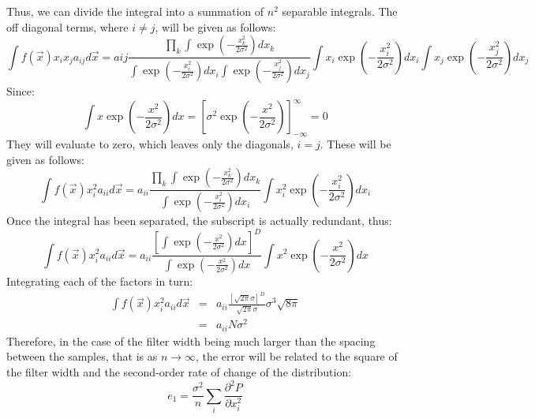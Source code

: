 \documentclass[11pt]{article}
\begin{document}
Thus, we can divide the integral into a summation of $n^2$ separable integrals.
The off diagonal terms, where $i \ne j$, will be given as follows:
\begin{equation}
  \int f(\vec x) x_i x_j a_{ij} d\vec x = 
	a{ij} \frac{\prod_k \int \exp \left (-\frac{x_k^2}{2\sigma^2} \right ) dx_k}
	{\int \exp \left (-\frac{x_i^2}{2\sigma^2} \right ) dx_i
	\int \exp \left (-\frac{x_j^2}{2\sigma^2} \right ) dx_j}
	\int x_i \exp \left (-\frac{x_i^2}{2\sigma^2} \right ) dx_i
	\int x_j \exp \left (-\frac{x_j^2}{2\sigma^2} \right ) dx_j
\end{equation}
Since:
\begin{equation}
  \int x \exp \left (-\frac{x^2}{2\sigma^2} \right ) dx 
	= \left [\sigma^2 \exp \left (-\frac{x^2}{2\sigma^2} \right ) \right ]_{-\infty}^\infty
	= 0
\end{equation}
They will evaluate to zero, which leaves only the diagonals, $i=j$.  
These will be given as follows:
\begin{equation}
  \int f(\vec x) x_i^2 a_{ii} d\vec x =  
	a_{ii} \frac{\prod_k \int \exp \left (-\frac{x_k^2}{2\sigma^2} \right ) dx_k}
        {\int \exp \left (-\frac{x_i^2}{2\sigma^2} \right ) dx_i}
        \int x_i^2 \exp \left (-\frac{x_i^2}{2\sigma^2} \right ) dx_i
\end{equation}
Once the integral has been separated, the subscript is actually redundant,
thus:
\begin{equation}
  \int f(\vec x) x_i^2 a_{ii} d\vec x =  
	a_{ii} \frac{ \left [ \int \exp \left (-\frac{x^2}{2\sigma^2} \right ) dx \right ]^D}
        {\int \exp \left (-\frac{x^2}{2\sigma^2} \right ) dx}
        \int x^2 \exp \left (-\frac{x^2}{2\sigma^2} \right ) dx
\end{equation}
Integrating each of the factors in turn:	
\begin{eqnarray}
  \int f(\vec x) x_i^2 a_{ii} d\vec x & = &
	a_{ii} \frac {\left [ \sqrt{2 \pi} \sigma \right ]^D}{\sqrt{2\pi} \sigma} \sigma^3 \sqrt{8 \pi} \\
	& = & a_{ii} N \sigma^2
\end{eqnarray}
Therefore, in the case of the filter width being much larger than the spacing between
the samples, that is as $n\rightarrow\infty$, the error will be related to the square
of the filter width and the second-order rate of change of the distribution:
\begin{equation}
  e_1 = \frac{\sigma^2}{n} \sum_i \frac{\partial^2 P}{\partial x_i^2}
\end{equation}
\end{document}
